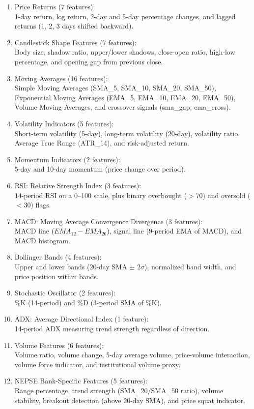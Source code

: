 \documentclass[12pt, a4paper]{report}
\begin{document}
	\vspace{-18pt}
	\begin{enumerate}
		\renewcommand{\labelenumi}{\roman{enumi}.}
		\item Price Returns (7 features):\\
		1-day return, log return, 2-day and 5-day percentage changes, and lagged returns (1, 2, 3 days shifted backward).
		\item Candlestick Shape Features (7 features):\\
		Body size, shadow ratio, upper/lower shadows, close-open ratio, high-low percentage, and opening gap from previous close.
		\item Moving Averages (16 features):\\
		Simple Moving Averages (SMA\_5, SMA\_10, SMA\_20, SMA\_50), Exponential Moving Averages (EMA\_5, EMA\_10, EMA\_20, EMA\_50), Volume Moving Averages, and crossover signals (sma\_gap, ema\_cross).
		\item Volatility Indicators (5 features):\\
		Short-term volatility (5-day), long-term volatility (20-day), volatility ratio, Average True Range (ATR\_14), and risk-adjusted return.
		\item Momentum Indicators (2 features):\\
		5-day and 10-day momentum (price change over period).
		\item RSI: Relative Strength Index (3 features):\\
		14-period RSI on a 0--100 scale, plus binary overbought ($>70$) and oversold ($<30$) flags.
		\item MACD: Moving Average Convergence Divergence (3 features):\\
		MACD line ($EMA_{12} - EMA_{26}$), signal line (9-period EMA of MACD), and MACD histogram.
		\item Bollinger Bands (4 features):\\
		Upper and lower bands ($20$-day SMA $\pm$ $2\sigma$), normalized band width, and price position within bands.
		\item Stochastic Oscillator (2 features):\\
		\%K (14-period) and \%D (3-period SMA of \%K).
		\item ADX: Average Directional Index (1 feature):\\
		14-period ADX measuring trend strength regardless of direction.
		\item Volume Features (6 features):\\
		Volume ratio, volume change, 5-day average volume, price-volume interaction, volume force indicator, and institutional volume proxy.
		\item NEPSE Bank-Specific Features (5 features):\\
		Range percentage, trend strength (SMA\_20/SMA\_50 ratio), volume stability, breakout detection (above 20-day SMA), and price squat indicator.
	\end{enumerate}
	
\end{document}
